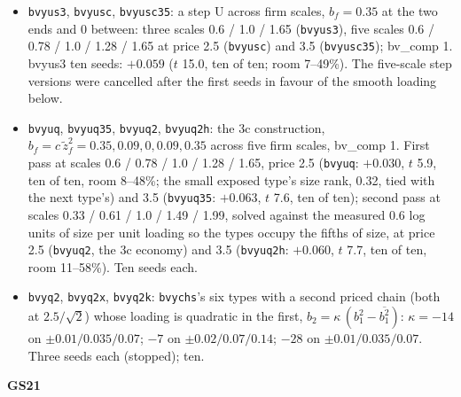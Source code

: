 \begin{itemize}
\item \texttt{bvyus3}, \texttt{bvyusc}, \texttt{bvyusc35}: a step U across firm scales, $b_f = 0.35$ at the two ends and 0 between: three scales 0.6 / 1.0 / 1.65 (\texttt{bvyus3}), five scales 0.6 / 0.78 / 1.0 / 1.28 / 1.65 at price 2.5 (\texttt{bvyusc}) and 3.5 (\texttt{bvyusc35}); bv\_comp 1. bvyus3 ten seeds: $+0.059$ ($t$ 15.0, ten of ten; room 7--49\%). The five-scale step versions were cancelled after the first seeds in favour of the smooth loading below.
\item \texttt{bvyuq}, \texttt{bvyuq35}, \texttt{bvyuq2}, \texttt{bvyuq2h}: the 3c construction, $b_f = c\,\tilde z_f^2 = 0.35, 0.09, 0, 0.09, 0.35$ across five firm scales, bv\_comp 1. First pass at scales 0.6 / 0.78 / 1.0 / 1.28 / 1.65, price 2.5 (\texttt{bvyuq}: $+0.030$, $t$ 5.9, ten of ten, room 8--48\%; the small exposed type's size rank, 0.32, tied with the next type's) and 3.5 (\texttt{bvyuq35}: $+0.063$, $t$ 7.6, ten of ten); second pass at scales 0.33 / 0.61 / 1.0 / 1.49 / 1.99, solved against the measured 0.6 log units of size per unit loading so the types occupy the fifths of size, at price 2.5 (\texttt{bvyuq2}, the 3c economy) and 3.5 (\texttt{bvyuq2h}: $+0.060$, $t$ 7.7, ten of ten, room 11--58\%). Ten seeds each.
\item \texttt{bvyq2}, \texttt{bvyq2x}, \texttt{bvyq2k}: \texttt{bvychs}'s six types with a second priced chain (both at $2.5/\sqrt2$) whose loading is quadratic in the first, $b_2=\kappa\,(b_1^2-\overline{b_1^2})$: $\kappa=-14$ on $\pm0.01/0.035/0.07$; $-7$ on $\pm0.02/0.07/0.14$; $-28$ on $\pm0.01/0.035/0.07$. Three seeds each (stopped); ten.
\end{itemize}
\noindent\textbf{GS21}
